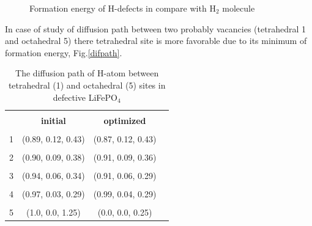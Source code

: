 \begin{figure}[h]
\begin{minipage}[h]{1\linewidth}
\end{minipage}
\caption{Formation energy of H-defects in compare with H$_2$ molecule}
\label{foren}
\end{figure}

In case of study of diffusion path between two probably vacancies (tetrahedral 1 and octahedral 5) there tetrahedral site is more favorable due to its minimum of formation energy, Fig.\ref{difpath}. 

\begin{table}[h]
\caption{The diffusion path of H-atom between tetrahedral (1) and octahedral (5) sites in defective LiFePO$_4$}
\label{tabular:difpath}
\begin{center}
\begin{tabular}{|c|c|c|c|}
\hline
& & \\
 \textbf{ } & \textbf{initial}& \textbf{optimized}  \\ 
\hline
& & \\
1 & (0.89, 0.12, 0.43) &  (0.87, 0.12, 0.43) \\ 
\hline
& & \\
2 & (0.90, 0.09, 0.38) & (0.91, 0.09, 0.36) \\
\hline
& & \\
3 & (0.94, 0.06, 0.34) & (0.91, 0.06, 0.29) \\
\hline
& & \\
4 & (0.97, 0.03, 0.29) & (0.99, 0.04, 0.29) \\
\hline
& & \\
5 & (1.0, 0.0, 1.25) &  (0.0, 0.0, 0.25)  \\
\hline
\end{tabular}
\end{center}
\end{table}

